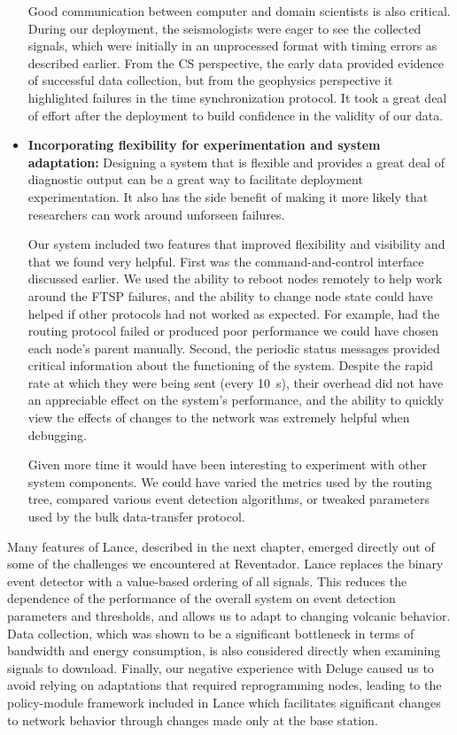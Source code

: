 \begin{itemize}
Good communication between computer and domain scientists is also critical.
During our deployment, the seismologists were eager to see the collected
signals, which were initially in an unprocessed format with timing errors as
described earlier. From the CS perspective, the early data provided evidence
of successful data collection, but from the geophysics perspective it
highlighted failures in the time synchronization protocol. It took a great
deal of effort after the deployment to build confidence in the validity of
our data.

\item \textbf{Incorporating flexibility for experimentation and system
adaptation:} Designing a system that is flexible and provides a great deal of
diagnostic output can be a great way to facilitate deployment
experimentation. It also has the side benefit of making it more likely that
researchers can work around unforseen failures.

Our system included two features that improved flexibility and visibility and
that we found very helpful. First was the command-and-control interface
discussed earlier. We used the ability to reboot nodes remotely to help work
around the FTSP failures, and the ability to change node state could have
helped if other protocols had not worked as expected. For example, had the
routing protocol failed or produced poor performance we could have chosen
each node's parent manually. Second, the periodic status messages provided
critical information about the functioning of the system. Despite the rapid
rate at which they were being sent (every 10~s), their overhead did not have
an appreciable effect on the system's performance, and the ability to quickly
view the effects of changes to the network was extremely helpful when
debugging.

Given more time it would have been interesting to experiment with other
system components. We could have varied the metrics used by the routing tree,
compared various event detection algorithms, or tweaked parameters used by
the bulk data-transfer protocol.

\end{itemize}

Many features of Lance, described in the next chapter, emerged directly out
of some of the challenges we encountered at Reventador. Lance replaces the
binary event detector with a value-based ordering of all signals. This
reduces the dependence of the performance of the overall system on event
detection parameters and thresholds, and allows us to adapt to changing
volcanic behavior. Data collection, which was shown to be a significant
bottleneck in terms of bandwidth and energy consumption, is also considered
directly when examining signals to download. Finally, our negative experience
with Deluge caused us to avoid relying on adaptations that required
reprogramming nodes, leading to the policy-module framework included in Lance
which facilitates significant changes to network behavior through changes
made only at the base station.
